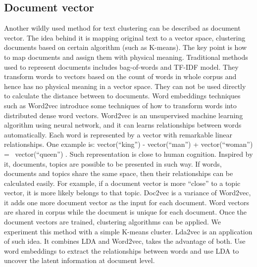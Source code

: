 \subsection{Document vector}
\label{sec:Document vector}
Another wildly used method for text clustering can be described as document vector. The idea behind it is mapping original text to a vector space, clustering documents based on certain algorithm (such as K-means). The key point is how to map documents and assign them with physical meaning. Traditional methods used to represent documents includes bag-of-words and TF-IDF model. They transform words to vectors based on the count of words in whole corpus and hence has no physical meaning in a vector space. They can not be used directly to calculate the distance between to documents. Word embeddings techniques such as Word2vec \cite{mikolov2013distributed,mikolov2013efficient} introduce some techniques of how to transform words into distributed dense word vectors. Word2vec is an unsupervised machine learning algorithm using neural network, and it can learns relationships between words automatically. Each word is represented by a vector with remarkable linear relationships. One example is: vector(“king”) - vector(“man”) + vector(“woman”) =~ vector(“queen”) \cite{journals/corr/cs-CL-0205028}. Such representation is close to human cognition. Inspired by it, documents, topics are possible to be presented in such way. If words, documents and topics share the same space, then their relationships can be calculated easily. For example, if a document vector is more ``close'' to a topic vector, it is more likely belongs to that topic. Doc2vec \cite{le2014distributed} is a variance of Word2vec, it adds one more document vector as the input for each document. Word vectors are shared in corpus while the document is unique for each document. Once the document vectors are trained, clustering algorithms can be applied. We experiment this method with a simple K-means cluster.  
Lda2vec \cite{moody2016mixing} is an application of such idea. It combines LDA and Word2vec, takes the advantage of both. Use word embeddings to extract the relationships between words and use LDA to uncover the latent information at document level. 

